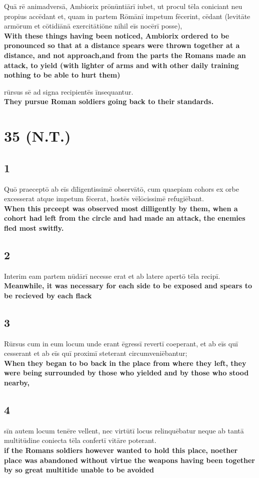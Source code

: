 \documentclass{article}
\begin{document}
Quā rē animadversā, Ambiorix prōnūntiārī iubet, ut procul tēla coniciant neu propius accēdant et, quam in partem Rōmānī impetum fēcerint, cēdant (levitāte armōrum et cōtidiānā exercitātiōne nihil eīs nocērī posse), \\ 
\textbf{With these things having been noticed, Ambiorix ordered to be pronounced so that at a distance spears were thrown together at a distance, and not approach,and from the parts the Romans made an attack, to yield (with lighter of arms and with other daily training nothing to be able to hurt them)}

rūrsus sē ad signa recipientēs īnsequantur. \\ 
\textbf{They pursue Roman soldiers going back to their standards.}

\section*{35 (N.T.)}
\subsection*{1}
Quō praeceptō ab eīs dīligentissimē observātō, cum quaepiam cohors ex orbe excesserat atque impetum fēcerat, hostēs vēlōcissimē refugiēbant.\\
\textbf{When this prceept was observed most dilligently by them, when a cohort had left from the circle and had made an attack, the enemies fled most switfly.}

\subsection*{2}
Interim eam partem nūdārī necesse erat et ab latere apertō tēla recipī.\\
\textbf{Meanwhile, it was necessary for each side to be exposed and spears to be recieved by each flack}

\subsection*{3}
Rūrsus cum in eum locum unde erant ēgressī revertī coeperant, et ab eīs quī cesserant et ab eīs quī proximī steterant circumveniēbantur; \\
\textbf{When they began to bo back in the place from where they left, they were being surrounded by those who yielded and by those who stood nearby,}

\subsection*{4}
sīn autem locum tenēre vellent, nec virtūtī locus relinquēbatur neque ab tantā multitūdine coniecta tēla confertī vitāre poterant. \\
\textbf{if the Romans soldiers however wanted to hold this place, noether place was abandoned without virtue the weapons having been together by so great multitide unable to be avoided}
\end{document}
